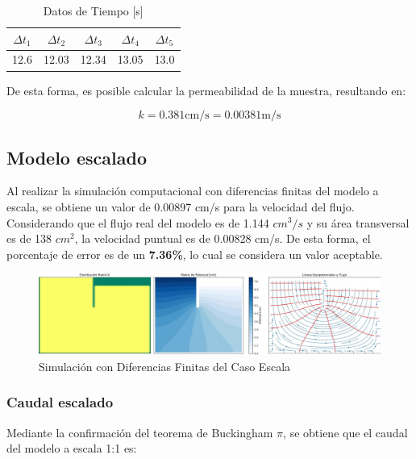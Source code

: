 \begin{table}[H]
    \centering
    \caption{Datos de Tiempo [s]}
    \begin{tabular}{|c|c|c|c|c|}
    \hline
    $\Delta t_1$ & $\Delta t_2$ & $\Delta t_3$ & $\Delta t_4$ & $\Delta t_5$ \\ \hline
    12.6 & 12.03 & 12.34 & 13.05 & 13.0 \\ \hline
    \end{tabular}
    \label{tab:tiempos}
\end{table}

De esta forma, es posible calcular la permeabilidad de la muestra, resultando en:

\begin{equation}
    k = 0.381 \text{cm/s} = 0.00381 \text{m/s}
\end{equation}

\subsection{Modelo escalado}

Al realizar la simulación computacional con diferencias finitas del modelo a escala, se obtiene un valor de 0.00897 cm/s para la velocidad del flujo. Considerando que el flujo real del modelo es de 1.144 $cm^3/s$ y su área transversal es de 138 $cm^2$, la velocidad puntual es de 0.00828 cm/s. De esta forma, el porcentaje de error es de un \textbf{7.36\%}, lo cual se considera un valor aceptable.


\begin{figure}[H]
    \centering
    \includegraphics[width=1\textwidth]{GRAFICOS/laplace_escala_cm.jpg}
    \caption{Simulación con Diferencias Finitas del Caso Escala}
    \label{fig:maqueta_caso_1}
\end{figure}

\subsubsection{Caudal escalado}

Mediante la confirmación del teorema de Buckingham $\pi$, se obtiene que el caudal del modelo a escala 1:1 es:


